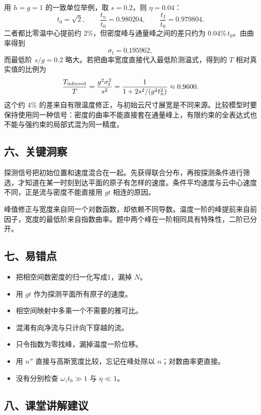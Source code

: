 \documentclass[12pt,a4paper,fontset=fandol]{ctexart}
\providecommand{\tightlist}{\setlength{\itemsep}{0pt}\setlength{\parskip}{0pt}}
\begin{document}
用 \(h=g=1\) 的一致单位举例，取 \(s=0.2\)，则 \(\eta=0.04\)： \[
t_0=\sqrt2,\qquad
\frac{t_n}{t_0}=0.980204,\qquad
\frac{t_I}{t_0}=0.979804.
\] 二者都比零温中心提前约 \(2\%\)，但密度峰与通量峰之间的差只约为
\(0.04\%\,t_0\)。由曲率得到 \[
\sigma_t=0.195962,
\] 而最低阶 \(s/g=0.2\) 略大。若把曲率宽度直接代入最低阶测温式，得到的
\(T\) 相对真实值的比例为 \[
\frac{T_{\rm inferred}}T
=\frac{g^2\sigma_t^2}{s^2}
=\frac1{1+2s^2/(g^2t_n^2)}
\approx0.9600.
\] 这个约 \(4\%\)
的差来自有限温度修正，与初始云尺寸展宽是不同来源。比较模型时要保持使用同一种信号：密度的曲率不能直接套在通量峰上，有限约束的全表达式也不能与强约束的局部式混为同一精度。

\subsection{六、关键洞察}\label{ux516dux5173ux952eux6d1eux5bdf}

探测信号把初始位置和速度混合在一起。先获得联合分布，再按探测条件进行筛选，才知道在某一时刻到达平面的原子有怎样的速度。条件平均速度与云中心速度不同，正是流与密度不能直接用
\(gt\) 相连的原因。

峰值修正与宽度来自同一个对数函数，却依赖不同导数。温度一阶的峰提前来自前因子，宽度的最低阶来自指数曲率。题中两个峰在一阶相同具有特殊性，二阶已分开。

\subsection{七、易错点}\label{ux4e03ux6613ux9519ux70b9}

\begin{itemize}
\tightlist
\item
  把相空间数密度的归一化写成1，漏掉 \(N\)。
\item
  用 \(gt\) 作为探测平面所有原子的速度。
\item
  相空间映射中多乘一个不需要的雅可比。
\item
  混淆有向净流与只计向下穿越的流。
\item
  只令指数为零找峰，漏掉温度一阶位移。
\item
  用 \(n''\) 直接与高斯宽度比较，忘记在峰处除以 \(n\)；对数曲率更直接。
\item
  没有分别检查 \(\omega_z t_0\gg1\) 与 \(\eta\ll1\)。
\end{itemize}

\subsection{八、课堂讲解建议}\label{ux516bux8bfeux5802ux8bb2ux89e3ux5efaux8bae}
\end{document}
